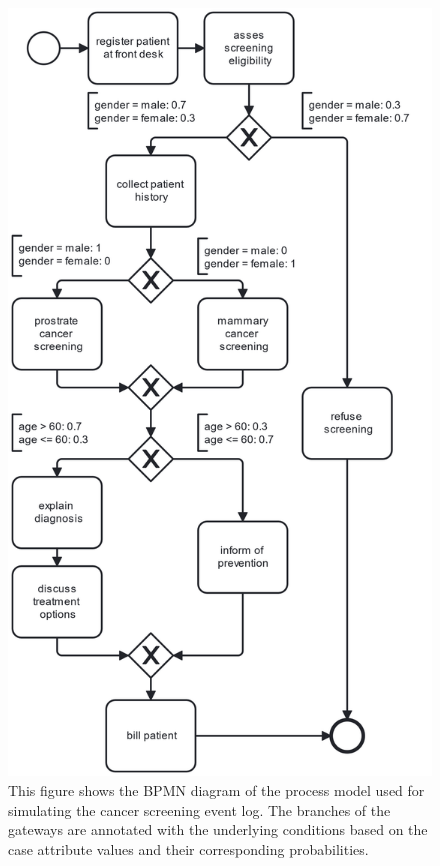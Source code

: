 \begin{figure}[h!]
    \centering
    \includegraphics[width=\textwidth,height=0.9\textheight,keepaspectratio]{gfx/cancer_screening.png}
    \caption{This figure shows the BPMN diagram of the process model used for simulating the cancer screening event log.
            The branches of the gateways are annotated with the underlying conditions based on the case attribute values and their corresponding probabilities.}
    \label{fig:cancer_screening}
\end{figure}

